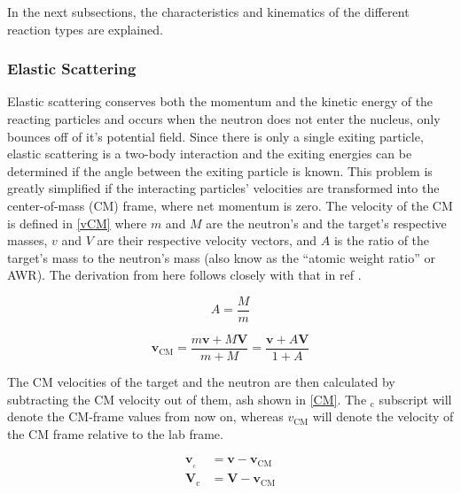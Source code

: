 In the next subsections, the characteristics and kinematics of the different reaction types are explained.

\subsubsection{Elastic Scattering}

Elastic scattering conserves both the momentum and the kinetic energy of the reacting particles and occurs when the neutron does not enter the nucleus, only bounces off of it's potential field.  Since there is only a single exiting particle, elastic scattering is a two-body interaction and the exiting energies can be determined if the angle between the exiting particle is known.  This problem is greatly simplified if the interacting particles' velocities are transformed into the center-of-mass (CM) frame, where net momentum is zero. The velocity of the CM is defined in \eqref{vCM} where $m$ and $M$ are the neutron's and the target's respective masses, $v$ and $V$ are their respective velocity vectors, and $A$ is the ratio of the target's mass to the neutron's mass (also know as the ``atomic weight ratio'' or AWR).  The derivation from here follows closely with that in ref \cite{jaakko}.

\begin{equation}
A = \frac{M}{m}
\label{AWR}
\end{equation}

\begin{equation}
\boldsymbol{v_{\mathrm{CM}}} = \frac{ m \boldsymbol{v} + M \boldsymbol{V} }    {m+M} = \frac{ \boldsymbol{v} + A \boldsymbol{V} }    {1+A}
\label{vCM}
\end{equation}

The CM velocities of the target and the neutron are then calculated by subtracting the CM velocity out of them, ash shown in \eqref{CM}.  The $_\mathrm{c}$ subscript will denote the CM-frame values from now on, whereas $v_{\mathrm{CM}}$ will denote the velocity of the CM frame relative to the lab frame.

\begin{equation}
\begin{split}
 \boldsymbol{v_{_\mathrm{c}}} &= \boldsymbol{v} - \boldsymbol{v_{\mathrm{CM}}} \\  
 \boldsymbol{V_{\mathrm{c}}} &= \boldsymbol{V} - \boldsymbol{v_{\mathrm{CM}}}
 \end{split}
\label{CM}
\end{equation}


